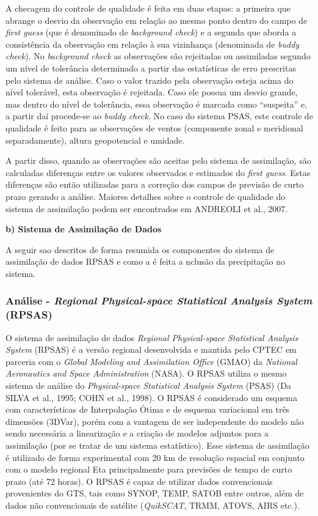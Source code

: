 A checagem do controle de qualidade é feita em duas etapas: a primeira que abrange o desvio da observação em relação ao mesmo ponto dentro do campo de \textit{first guess} (que é denominado de \textit{background check}) e a segunda que aborda a consistência da observação em relação à sua vizinhança (denominada de \textit{buddy check}). No \textit{background check} as observações são rejeitadas ou assimiladas segundo um nível de tolerância determinado a partir das estatísticas de erro prescritas pelo sistema de análise. Caso o valor trazido pela observação esteja acima do nível tolerável, esta observação é rejeitada. Caso ele possua um desvio grande, mas dentro do nível de tolerância, essa observação é marcada como “suspeita” e, a partir daí procede-se ao \textit{buddy check}. No caso do sistema PSAS, este controle de qualidade é feito para as observações de ventos (componente zonal e meridional separadamente), altura geopotencial e umidade.

A partir disso, quando as observações são aceitas pelo sistema de assimilação, são calculadas diferenças entre os valores observados e estimados do \textit{first guess}. Estas diferenças são então utilizadas para a correção dos campos de previsão de curto prazo gerando a análise.  Maiores detalhes sobre o controle de qualidade do sistema de assimilação podem ser encontrados em ANDREOLI et al., 2007.

\textbf{b) Sistema de Assimilação de Dados}

A seguir sao descritos de forma resumida os componentes do sistema de assimilação de dados RPSAS e como a é feita a nclusão da precipitação no sistema.

\subsubsection{Análise - \textit{Regional Physical-space Statistical Analysis System} (RPSAS)}

O sistema de assimilação de dados \textit{Regional Physical-space Statistical Analysis System} (RPSAS) é a versão regional desenvolvida e mantida pelo CPTEC em parceria com o \textit{Global Modeling and Assimilation Office} (GMAO) da \textit{National Aeronautics and Space Administration} (NASA). O RPSAS utiliza o mesmo sistema de análise do \textit{Physical-space Statistical Analysis System} (PSAS) (Da SILVA et al., 1995; COHN et al., 1998). O RPSAS é considerado um esquema com características de Interpolação Ótima e de esquema variacional em três dimensões (3DVar), porém com a vantagem de ser independente do modelo não sendo necessária a linearização e a criação de modelos adjuntos para a assimilação (por se tratar de um sistema estatístico). Esse sistema de assimilação é utilizado de forma experimental com 20 km de resolução espacial em conjunto com o modelo regional Eta principalmente para previsões de tempo de curto prazo (até 72 horas). O RPSAS é capaz de utilizar dados convencionais provenientes do GTS, tais como SYNOP, TEMP, SATOB entre outros, além de dados não convencionais de satélite (\textit{QuikSCAT}, TRMM, ATOVS, AIRS etc.). 

